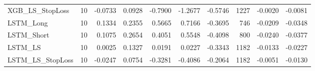 \begin{tabular}{llrrrrrrrr}
\cline{1-10}
XGB\_LS\_StopLoss & 10 & -0.0733 & 0.0928 & -0.7900 & -1.2677 & -0.5746 & 1227 & -0.0020 & -0.0081 \\
\cline{1-10}
LSTM\_Long & 10 & 0.1334 & 0.2355 & 0.5665 & 0.7166 & -0.3695 & 746 & -0.0209 & -0.0348 \\
\cline{1-10}
LSTM\_Short & 10 & 0.1075 & 0.2654 & 0.4051 & 0.5548 & -0.4098 & 800 & -0.0240 & -0.0377 \\
\cline{1-10}
LSTM\_LS & 10 & 0.0025 & 0.1327 & 0.0191 & 0.0227 & -0.3343 & 1182 & -0.0133 & -0.0227 \\
\cline{1-10}
LSTM\_LS\_StopLoss & 10 & -0.0247 & 0.0754 & -0.3281 & -0.4086 & -0.2064 & 1182 & -0.0051 & -0.0130 \\
\cline{1-10}
\bottomrule
\end{tabular}
